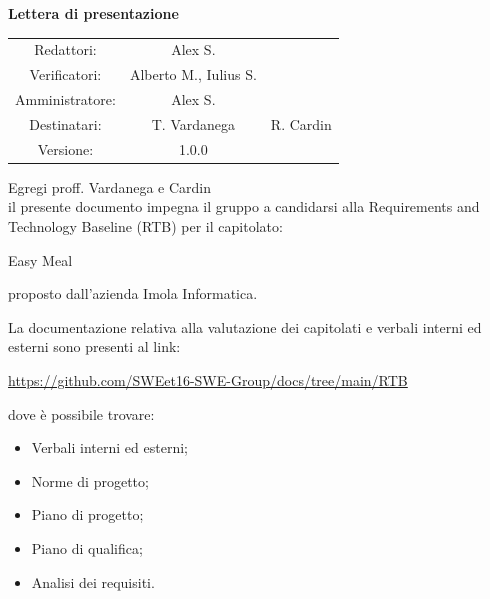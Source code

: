 \documentclass[a4paper, 11pt]{article}
\begin{document}
\begin{center}
\begin{Huge}
        \textbf{Lettera di presentazione} \\
        \vspace{4mm}

\end{Huge}

\vspace{20mm}

\begin{large}
\begin{spacing}{1.4}
\begin{tabular}{c c c}
   Redattori: & Alex S. & \\
   Verificatori: & Alberto M., Iulius S. & \\
   Amministratore: & Alex S. & \\
   Destinatari: & T. Vardanega & R. Cardin \\
   Versione: & 1.0.0 &
\end{tabular}
\end{spacing}
\end{large}
\end{center}

\pagebreak

Egregi proff. Vardanega e Cardin\\
il presente documento impegna il gruppo a candidarsi alla Requirements and Technology Baseline
(RTB) per il capitolato:

\begin{center}
  Easy Meal
\end{center}

proposto dall'azienda Imola Informatica.

\par

La documentazione relativa alla valutazione dei capitolati e verbali
interni ed esterni sono presenti al link:
\begin{center}
    \url{https://github.com/SWEet16-SWE-Group/docs/tree/main/RTB}
\end{center}
dove è possibile trovare:
\begin{itemize}
  \item Verbali interni ed esterni;
  \item Norme di progetto;
  \item Piano di progetto;
  \item Piano di qualifica;
  \item Analisi dei requisiti.
\end{itemize}
\end{document}
